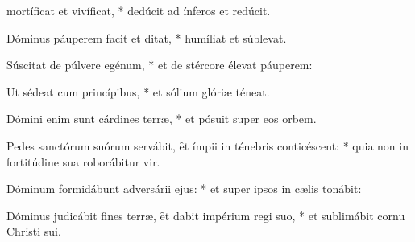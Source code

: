 \begin{psalmus}

 mortíficat et vivíficat, * dedúcit ad ínferos et redúcit.

Dóminus páuperem facit et ditat, * humíliat et súblevat.

Súscitat de púlvere egénum, * et de stércore élevat páuperem:

Ut sédeat cum princípibus, * et sólium glóriæ téneat.

Dómini enim sunt cárdines terræ, * et pósuit super eos orbem.

Pedes sanctórum suórum servábit, \f et ímpii in ténebris conticéscent: * quia non in fortitúdine sua roborábitur vir.

Dóminum formidábunt adversárii ejus: * et super ipsos in cælis tonábit:

Dóminus judicábit fines terræ, \f et dabit impérium regi suo, * et sublimábit cornu Christi sui.

\end{psalmus}
